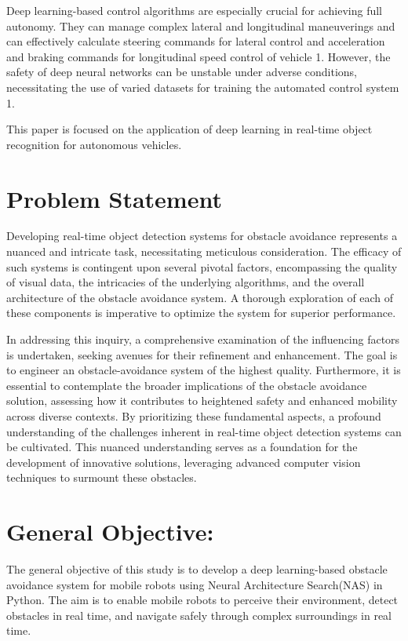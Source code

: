 Deep learning-based control algorithms are especially crucial for achieving full autonomy. They can manage complex lateral and longitudinal maneuverings and can effectively calculate steering commands for lateral control and acceleration and braking commands for longitudinal speed control of vehicle 1. However, the safety of deep neural networks can be unstable under adverse conditions, necessitating the use of varied datasets for training the automated control system 1.

This paper is focused on the application of deep learning in real-time object recognition for autonomous vehicles. 







\section{Problem Statement}
Developing real-time object detection systems for obstacle avoidance represents a nuanced and intricate task, necessitating meticulous consideration. The efficacy of such systems is contingent upon several pivotal factors, encompassing the quality of visual data, the intricacies of the underlying algorithms, and the overall architecture of the obstacle avoidance system. A thorough exploration of each of these components is imperative to optimize the system for superior performance.

In addressing this inquiry, a comprehensive examination of the influencing factors is undertaken, seeking avenues for their refinement and enhancement. The goal is to engineer an obstacle-avoidance system of the highest quality. Furthermore, it is essential to contemplate the broader implications of the obstacle avoidance solution, assessing how it contributes to heightened safety and enhanced mobility across diverse contexts. By prioritizing these fundamental aspects, a profound understanding of the challenges inherent in real-time object detection systems can be cultivated. This nuanced understanding serves as a foundation for the development of innovative solutions, leveraging advanced computer vision techniques to surmount these obstacles.

\section{General Objective:}
The general objective of this study is to develop a deep learning-based obstacle avoidance system for mobile robots using Neural Architecture Search(NAS) in Python. The aim is to enable mobile robots to perceive their environment, detect obstacles in real time, and navigate safely through complex surroundings in real time.
